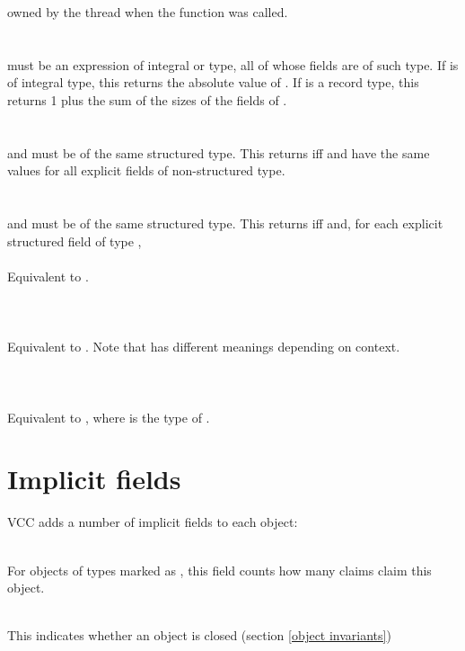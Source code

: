 \documentclass[preprint,nocopyrightspace]{sigplanconf}
\begin{document}
{{{owned by the thread when the function was called.
\\\\
\\
 must be an expression of integral or 
type, all of whose fields are of such type. If  is of integral
type, this returns the absolute value of . If  is a
record type, this returns 1 plus the sum of the sizes of the fields
of . 
\\\\
\\
 and  must be of the same structured type.
This returns \vcc{\true} iff  and  have the same
values for all explicit fields of non-structured type.
\\\\
\\
 and  must be of the same structured type. 
This returns \vcc{\true} iff  and, for each explicit
structured field  of type , 
\\\\
Equivalent to .
\\\\
\\
\\
Equivalent to . Note that \vcc{\old} has
different meanings depending on context.\\
\\\\
\\
Equivalent to , where  is the type of .


\section{Implicit fields}

VCC adds a number of implicit fields to each object:

\\
For objects of types marked as , this field counts how many claims claim this object.

\\
This indicates whether an object is closed (section \ref{object invariants})

}}}
\end{document}
